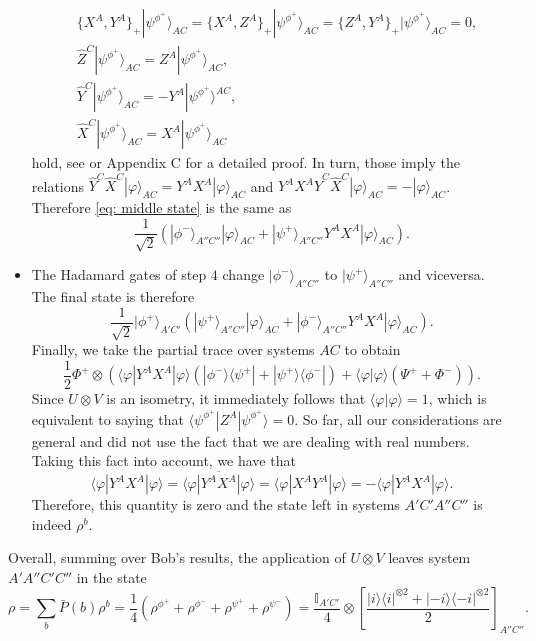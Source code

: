 \documentclass[onecolumn,prx,amsmath,amssymb]{revtex4-2}
\def\be{\begin{equation}}
\def\ee{\end{equation}}
\def\bra#1{\langle#1|} \def\ket#1{|#1\rangle}
\def\braket#1#2{\langle#1|#2\rangle}
\def\ketbra#1#2{\ket{#1}\!\bra{#2}}
\def\proj#1{\ket{#1}\!\bra{#1}}
\def\id{{\mathbb I}}
\begin{document}
\begin{appendix}
\begin{itemize}
\begin{align}
&\{X^A,Y^A\}_{+}\ket{\psi^{\phi^+}}_{{AC}}=\{X^A,Z^A\}_{+}\ket{\psi^{\phi^+}}_{{AC}}=\{Z^A,Y^A\}_{+}\ket{\psi^{\phi^+}}_{{AC}}=0,\nonumber\\
&\hat{Z}^C \ket{\psi^{\phi^+}}_{{AC}} = Z^A \ket{\psi^{\phi^+}}_{{AC}},\nonumber\\ 
&\hat{Y}^C \ket{\psi^{\phi^+}}_{{AC}} = -Y^A \ket{\psi^{\phi^+}}^{{AC}},\nonumber\\
&\hat{X}^C \ket{\psi^{\phi^+}}_{{AC}} = X^A \ket{\psi^{\phi^+}}_{{AC}}
\end{align}
\noindent hold, see \cite{self_testing} or Appendix C for a detailed proof. In turn, those imply the relations $\hat{Y}^C\hat{X}^C \ket{\varphi}_{{AC}} = Y^AX^A \ket{\varphi}_{{AC}}$ and $Y^A X^A\hat{Y}^C\hat{X}^C \ket{\varphi}_{{AC}} = - \ket{\varphi}_{{AC}}$.
Therefore \eqref{eq: middle state} is the same as 
\[
\frac{1}{\sqrt{2}} (\ket{\phi^-}_{A''C''} \ket{\varphi}_{{AC}} + \ket{\psi^+}_{A''C''} Y^A X^A \ket{\varphi}_{{AC}}).
\]

\item The Hadamard gates of step $4$ change $\ket{\phi^-}_{A''C''}$ to $\ket{\psi^+}_{A''C''}$ and viceversa. The final state is therefore
\[
\frac{1}{\sqrt{2}}\ket{\phi^+}_{A'C'}(\ket{\psi^+}_{A''C''} \ket{\varphi}_{{AC}} + \ket{\phi^-}_{A''C''} Y^A X^A \ket{\varphi}_{{AC}}).
\]
Finally, we take the partial trace over systems ${AC}$ to obtain
\[
\frac{1}{2} \Phi^+ \otimes \left(\bra{\varphi}Y^A X^A \ket{\varphi}(\ketbra{\phi^-}{\psi^+}+\ketbra{\psi^+}{\phi^-}) + \braket{\varphi}{\varphi} (\Psi^++\Phi^-)\right).
\]
Since $U\otimes V$ is an isometry, it immediately follows that $\braket{\varphi}{\varphi} = 1 $, which is equivalent to saying that $\bra{\psi^{\phi^+}}Z^A \ket{\psi^{\phi^+}}=0$. So far, all our considerations are general and did not use the fact that we are dealing with real numbers. Taking this fact into account, we have that
\[
\bra{\varphi} Y^A X^A \ket{\varphi} = \overline{\bra{\varphi} Y^A X^A \ket{\varphi}} = \bra{\varphi} X^A Y^A  \ket{\varphi} = - \bra{\varphi} Y^A X^A \ket{\varphi}.
\]
Therefore, this quantity is zero and the state left in systems $A'C'A''C''$ is indeed $\rho^b$.
\end{itemize}

Overall, summing over Bob's results, the application of ${ U}\otimes{ V}$ leaves system $A'A''C'C''$ in the state
\be
\rho=\sum_b \bar{P}(b)\rho^b=\frac{1}{4}\left(\rho^{\phi^+}+\rho^{\phi^-}+\rho^{\psi^+}+\rho^{\psi^-}\right)=\frac{\id_{A'C'}}{4}\otimes \left[\frac{\proj{i}^{\otimes 2}+\proj{-i}^{\otimes 2}}{2}\right]_{A''C''}.
\label{suma}
\ee



\end{appendix}
\end{document}
